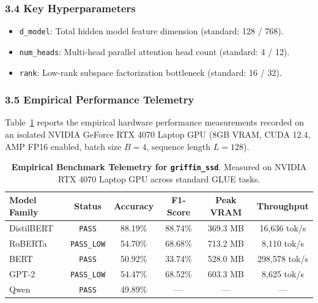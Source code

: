 \subsubsection*{3.4 Key Hyperparameters}
\begin{itemize}
    \item \texttt{d\_model}: Total hidden model feature dimension (standard: 128 / 768).
    \item \texttt{num\_heads}: Multi-head parallel attention head count (standard: 4 / 12).
    \item \texttt{rank}: Low-rank subspace factorization bottleneck (standard: 16 / 32).
\end{itemize}

\subsubsection*{3.5 Empirical Performance Telemetry}
Table~\ref{tab:telemetry_griffin_ssd} reports the empirical hardware performance measurements recorded on an isolated NVIDIA GeForce RTX 4070 Laptop GPU (8GB VRAM, CUDA 12.4, AMP FP16 enabled, batch size $B=4$, sequence length $L=128$).

\begin{table}[h]
\centering
\small
\caption{\textbf{Empirical Benchmark Telemetry for \texttt{griffin\_ssd}}. Measured on NVIDIA RTX 4070 Laptop GPU across standard GLUE tasks.}
\label{tab:telemetry_griffin_ssd}
\begin{tabular*}{\columnwidth}{@{\extracolsep{\fill}}lccccc}
\toprule
\textbf{Model Family} & \textbf{Status} & \textbf{Accuracy} & \textbf{F1-Score} & \textbf{Peak VRAM} & \textbf{Throughput} \\
\midrule
DistilBERT & \texttt{PASS} & 88.19\% & 88.74\% & 369.3 MB & 16,636 tok/s \\
RoBERTa & \texttt{PASS\_LOW} & 54.70\% & 68.68\% & 713.2 MB & 8,110 tok/s \\
BERT & \texttt{PASS} & 50.92\% & 33.74\% & 528.0 MB & 298,578 tok/s \\
GPT-2 & \texttt{PASS\_LOW} & 54.47\% & 68.52\% & 603.3 MB & 8,625 tok/s \\
Qwen & \texttt{PASS} & 49.89\% & --- & --- & --- \\
\bottomrule
\end{tabular*}
\end{table}

